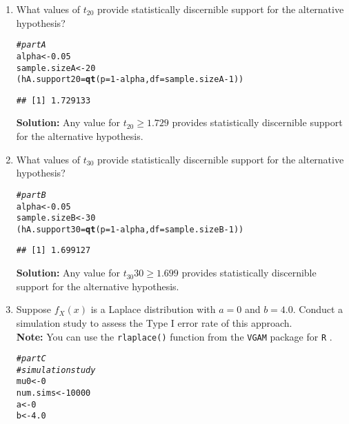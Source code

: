 \documentclass{article}\usepackage[]{graphicx}\usepackage[]{xcolor}
\makeatletter
\newcommand{\hlnum}[1]{\textcolor[rgb]{0.686,0.059,0.569}{#1}}%
\newcommand{\hlcom}[1]{\textcolor[rgb]{0.678,0.584,0.686}{\textit{#1}}}%
\newcommand{\hlopt}[1]{\textcolor[rgb]{0,0,0}{#1}}%
\newcommand{\hldef}[1]{\textcolor[rgb]{0.345,0.345,0.345}{#1}}%
\newcommand{\hlkwb}[1]{\textcolor[rgb]{0.69,0.353,0.396}{#1}}%
\newcommand{\hlkwc}[1]{\textcolor[rgb]{0.333,0.667,0.333}{#1}}%
\newcommand{\hlkwd}[1]{\textcolor[rgb]{0.737,0.353,0.396}{\textbf{#1}}}%
\newenvironment{kframe}{%
 \def\at@end@of@kframe{}%
 \ifinner\ifhmode%
  \def\at@end@of@kframe{\end{minipage}}%
  \begin{minipage}{\columnwidth}%
 \fi\fi%
 \def\FrameCommand##1{\hskip\@totalleftmargin \hskip-\fboxsep
 \colorbox{shadecolor}{##1}\hskip-\fboxsep
     \hskip-\linewidth \hskip-\@totalleftmargin \hskip\columnwidth}%
 \MakeFramed {\advance\hsize-\width
   \@totalleftmargin\z@ \linewidth\hsize
   \@setminipage}}%
 {\par\unskip\endMakeFramed%
 \at@end@of@kframe}
\newenvironment{knitrout}{}{} %
\makeatother
\begin{document}
\begin{enumerate}
\begin{enumerate}
  \item What values of $t_{20}$ provide statistically discernible support for the
  alternative hypothesis?
\begin{knitrout}
\color{fgcolor}\begin{kframe}
\begin{alltt}
  \hlcom{# part A }
\hldef{alpha} \hlkwb{<-} \hlnum{0.05}
\hldef{sample.sizeA} \hlkwb{<-} \hlnum{20}
\hldef{(hA.support20} \hlkwb{=} \hlkwd{qt}\hldef{(}\hlkwc{p} \hldef{=} \hlnum{1}\hlopt{-}\hldef{alpha,} \hlkwc{df} \hldef{= sample.sizeA}\hlopt{-}\hlnum{1}\hldef{))}
\end{alltt}
\begin{verbatim}
## [1] 1.729133
\end{verbatim}
\end{kframe}
\end{knitrout}
\textbf{Solution:} Any value for $t_{20} \geq 1.729$ provides statistically discernible support for the alternative hypothesis.
  \item What values of $t_{30}$ provide statistically discernible support for the
  alternative hypothesis?
\begin{knitrout}
\color{fgcolor}\begin{kframe}
\begin{alltt}
\hlcom{# part B}
\hldef{alpha} \hlkwb{<-} \hlnum{0.05}
\hldef{sample.sizeB} \hlkwb{<-} \hlnum{30}
\hldef{(hA.support30} \hlkwb{=} \hlkwd{qt}\hldef{(}\hlkwc{p} \hldef{=} \hlnum{1}\hlopt{-}\hldef{alpha,} \hlkwc{df} \hldef{= sample.sizeB}\hlopt{-}\hlnum{1}\hldef{))}
\end{alltt}
\begin{verbatim}
## [1] 1.699127
\end{verbatim}
\end{kframe}
\end{knitrout}
\textbf{Solution:} Any value for $t_30{30} \geq 1.699$ provides statistically discernible support for the alternative hypothesis.
  \item Suppose $f_X(x)$ is a Laplace distribution with $a=0$ and $b=4.0$.
  Conduct a simulation study to assess the Type I error rate of this approach.\\
  \textbf{Note:} You can use the \texttt{rlaplace()} function from the \texttt{VGAM}
  package for \texttt{R} \citep{VGAM}.
\begin{knitrout}
\color{fgcolor}\begin{kframe}
\begin{alltt}
\hlcom{# part C }
\hlcom{# simulation study }
\hldef{mu0} \hlkwb{<-} \hlnum{0}
\hldef{num.sims} \hlkwb{<-} \hlnum{10000}
\hldef{a} \hlkwb{<-} \hlnum{0}
\hldef{b} \hlkwb{<-} \hlnum{4.0}


\end{alltt}
\end{kframe}
\end{knitrout}
\end{enumerate}
\end{enumerate}
\end{document}
